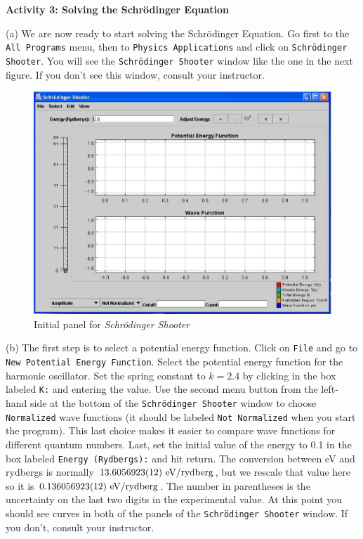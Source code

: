\textbf{Activity 3: Solving the Schr\"odinger Equation}

(a) We are now ready to start solving the Schr\"odinger Equation.
Go first to the {\tt All Programs} menu, then
to {\tt Physics Applications} and click on {\tt Schr\"odinger Shooter}.
You will see the {\tt Schr\"odinger Shooter} window like the one in the next figure.
If you don't see this window, consult your instructor.
\begin{figure}[hbt]
\begin{center}
\includegraphics[width=6.0in]{solveSE/shooter1b.eps}
\caption{Initial panel for {\it Schr\"odinger Shooter}}
\end{center}
\end{figure}

(b) The first step is to select a potential energy function.
Click on {\tt File} and go to {\tt New Potential Energy Function}.
Select the potential energy function for the harmonic oscillator.
Set the spring constant to $k=2.4$ by clicking in the box labeled {\tt K:}
and entering the value.
Use the second menu button from the left-hand side 
at the bottom of the {\tt Schr\"odinger Shooter}
window to choose {\tt Normalized} wave functions (it should be labeled {\tt Not Normalized}
when you start the program).
This last choice makes it easier to compare wave functions for different quantum numbers.
Last, set the initial value of the energy to 0.1 in the box labeled 
{\tt Energy (Rydbergs):} and hit return.
The conversion between eV and rydbergs is normally $\rm 13.605 6923(12)~ eV/rydberg$,
but we rescale that value here so it is $\rm 0.13605 6923(12)~ eV/rydberg$.
The number in parentheses is the uncertainty on the last two digits in the
experimental value.
At this point you should see curves in both of the panels of the 
{\tt Schr\"odinger Shooter} window.
If you don't, consult your instructor.

